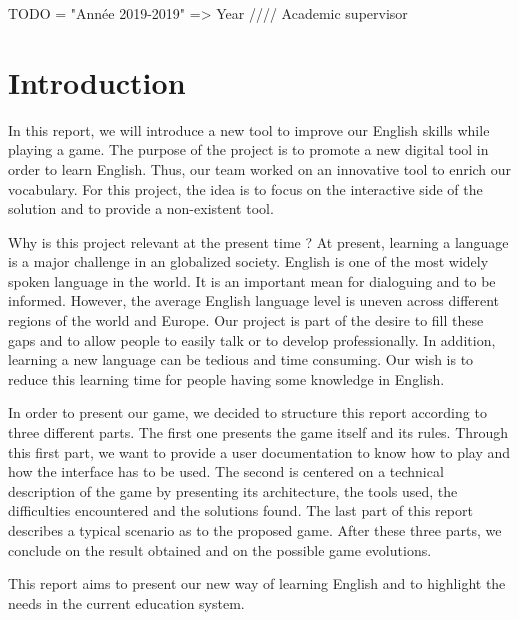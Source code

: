 \documentclass{tnreport}
\begin{document}
\maketitle
TODO = "Année 2019-2019" => Year //// Academic supervisor

\cleardoublepage

\renewcommand{\baselinestretch}{0.5}\normalsize
\tableofcontents
\renewcommand{\baselinestretch}{1.0}\normalsize

\cleardoublepage

\chapter{Introduction}

In this report, we will introduce a new tool to improve our English skills while playing a game. The purpose of the project is to promote a new digital tool in order to learn English. Thus, our team worked on an innovative tool to enrich our vocabulary. For this project, the idea is to focus on the interactive side of the solution and to provide a non-existent tool. 

Why is this project relevant at the present time ? At present, learning a language is a major challenge in an globalized society. English is one of the most widely spoken language in the world. It is an important mean for dialoguing and to be informed. However, the average English language level is uneven across different regions of the world and Europe. Our project is part of the desire to fill these gaps and to allow people to easily talk or to develop professionally. In addition, learning a new language can be tedious and time consuming. Our wish is to reduce this learning time for people having some knowledge in English. 

In order to present our game, we decided to structure this report according to three different parts. The first one presents the game itself and its rules. Through this first part, we want to provide a user documentation to know how to play and how the interface has to be used. The second is centered on a technical description of the game by presenting its architecture, the tools used, the difficulties encountered and the solutions found. The last part of this report describes a typical scenario as to the proposed game. After these three parts, we conclude on the result obtained and on the possible game evolutions. 

This report aims to present our new way of learning English and to highlight the needs in the current education system. 
\end{document}
